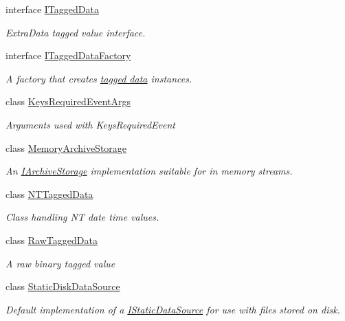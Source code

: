 \begin{DoxyCompactItemize}
interface \hyperlink{interface_i_c_sharp_code_1_1_sharp_zip_lib_1_1_zip_1_1_i_tagged_data}{I\+Tagged\+Data}
\begin{DoxyCompactList}\small\item\em Extra\+Data tagged value interface. \end{DoxyCompactList}\item 
interface \hyperlink{interface_i_c_sharp_code_1_1_sharp_zip_lib_1_1_zip_1_1_i_tagged_data_factory}{I\+Tagged\+Data\+Factory}
\begin{DoxyCompactList}\small\item\em A factory that creates \hyperlink{interface_i_c_sharp_code_1_1_sharp_zip_lib_1_1_zip_1_1_i_tagged_data}{tagged data} instances. \end{DoxyCompactList}\item 
class \hyperlink{class_i_c_sharp_code_1_1_sharp_zip_lib_1_1_zip_1_1_keys_required_event_args}{Keys\+Required\+Event\+Args}
\begin{DoxyCompactList}\small\item\em Arguments used with Keys\+Required\+Event \end{DoxyCompactList}\item 
class \hyperlink{class_i_c_sharp_code_1_1_sharp_zip_lib_1_1_zip_1_1_memory_archive_storage}{Memory\+Archive\+Storage}
\begin{DoxyCompactList}\small\item\em An \hyperlink{interface_i_c_sharp_code_1_1_sharp_zip_lib_1_1_zip_1_1_i_archive_storage}{I\+Archive\+Storage} implementation suitable for in memory streams. \end{DoxyCompactList}\item 
class \hyperlink{class_i_c_sharp_code_1_1_sharp_zip_lib_1_1_zip_1_1_n_t_tagged_data}{N\+T\+Tagged\+Data}
\begin{DoxyCompactList}\small\item\em Class handling NT date time values. \end{DoxyCompactList}\item 
class \hyperlink{class_i_c_sharp_code_1_1_sharp_zip_lib_1_1_zip_1_1_raw_tagged_data}{Raw\+Tagged\+Data}
\begin{DoxyCompactList}\small\item\em A raw binary tagged value \end{DoxyCompactList}\item 
class \hyperlink{class_i_c_sharp_code_1_1_sharp_zip_lib_1_1_zip_1_1_static_disk_data_source}{Static\+Disk\+Data\+Source}
\begin{DoxyCompactList}\small\item\em Default implementation of a \hyperlink{interface_i_c_sharp_code_1_1_sharp_zip_lib_1_1_zip_1_1_i_static_data_source}{I\+Static\+Data\+Source} for use with files stored on disk. \end{DoxyCompactList}\item 

\end{DoxyCompactItemize}
